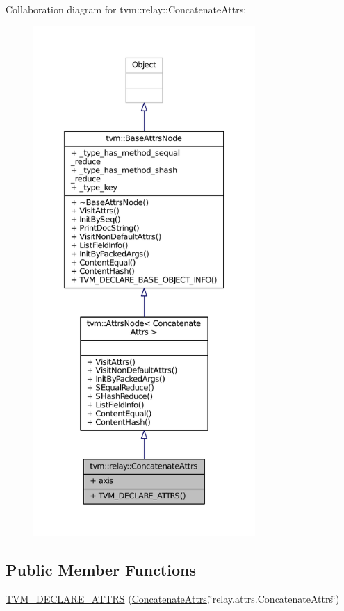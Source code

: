 Collaboration diagram for tvm\+:\+:relay\+:\+:Concatenate\+Attrs\+:
\nopagebreak
\begin{figure}[H]
\begin{center}
\leavevmode
\includegraphics[height=550pt]{structtvm_1_1relay_1_1ConcatenateAttrs__coll__graph}
\end{center}
\end{figure}
\subsection*{Public Member Functions}
\begin{DoxyCompactItemize}
\item 
\hyperlink{structtvm_1_1relay_1_1ConcatenateAttrs_ab12dc6de2e0bd0804ef0a12670cefa50}{T\+V\+M\+\_\+\+D\+E\+C\+L\+A\+R\+E\+\_\+\+A\+T\+T\+RS} (\hyperlink{structtvm_1_1relay_1_1ConcatenateAttrs}{Concatenate\+Attrs},\char`\"{}relay.\+attrs.\+Concatenate\+Attrs\char`\"{})
\end{DoxyCompactItemize}
